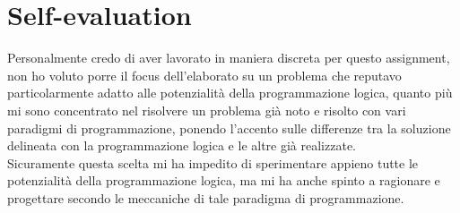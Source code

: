 \documentclass[10pt,italian]{article}
\begin{document}
\section{Self-evaluation}
Personalmente credo di aver lavorato in maniera discreta per questo assignment, non ho voluto porre il focus dell'elaborato su un problema che reputavo particolarmente adatto alle potenzialità della programmazione logica, quanto più mi sono concentrato nel risolvere un problema già noto e risolto con vari paradigmi di programmazione, ponendo l'accento sulle differenze tra la soluzione delineata con la programmazione logica e le altre già realizzate.\\
Sicuramente questa scelta mi ha impedito di sperimentare appieno tutte le potenzialità della programmazione logica, ma mi ha anche spinto a ragionare e progettare secondo le meccaniche di tale paradigma di programmazione.

 
\end{document}
